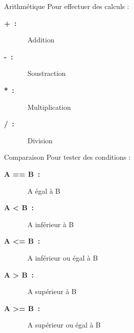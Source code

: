 \begin{frame}{Arithmétique}
  Pour effectuer des calculs :
  \begin{description}
    \item[\textbf{\large{+ :}}]  Addition
    \item[\textbf{\large{- :}}]  Soustraction
    \item[\textbf{\large{* :}}]  Multiplication
    \item[\textbf{\large{/ :}}]  Division
  \end{description}
\end{frame}

\begin{frame}{Comparaison}
  Pour tester des conditions :
  \begin{description}
    \item[\textbf{\large{A == B :}}]  A égal à B
    \item[\textbf{\large{A < B :}}]   A inférieur à B
    \item[\textbf{\large{A <= B :}}]  A inférieur ou égal à B
    \item[\textbf{\large{A > B :}}]   A supérieur à B
    \item[\textbf{\large{A >= B :}}]  A supérieur ou égal à B
  \end{description}
\end{frame}

